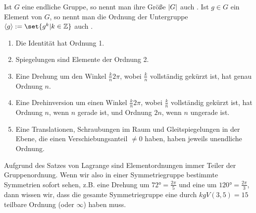 \begin{definition}
Ist $G$ eine endliche Gruppe, so nennt man ihre Größe $\lvert G\rvert$ auch . Ist $g\in G$ ein Element von $G$, so nennt man die Ordnung der Untergruppe $\langle g\rangle:=\set{g^k | k\in\IZ}$ auch .
\end{definition}

\begin{example}
\begin{enumerate}
\item Die Identität hat Ordnung 1.
\item Spiegelungen sind Elemente der Ordnung 2.
\item Eine Drehung um den Winkel $\frac{k}{n}2\pi$, wobei $\frac{k}{n}$ vollständig gekürzt ist, hat genau Ordnung $n$.
\item Eine Drehinversion um einen Winkel $\frac{k}{n}2\pi$, wobei $\frac{k}{n}$ vollständig gekürzt ist, hat Ordnung $n$, wenn $n$ gerade ist, und Ordnung $2n$, wenn $n$ ungerade ist.
\item Eine Translationen, Schraubungen im Raum und Gleitspiegelungen in der Ebene, die einen Verschiebungsanteil $\neq 0$ haben, haben jeweils unendliche Ordnung.
\end{enumerate}
\end{example}

\begin{remark}
Aufgrund des Satzes von Lagrange sind Elementordnungen immer Teiler der Gruppenordnung. Wenn wir also in einer Symmetriegruppe bestimmte Symmetrien sofort sehen, z.B. eine Drehung um $72°=\frac{2\pi}{5}$ und eine um $120°=\frac{2\pi}{3}$, dann wissen wir, dass die gesamte Symmetriegruppe eine durch $kgV(3,5)=15$ teilbare Ordnung (oder $\infty$) haben muss.
\end{remark}

